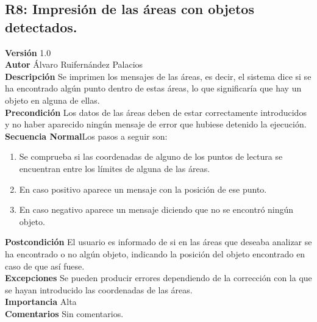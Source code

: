 \subsection{R8: Impresión de las áreas con objetos detectados.}
\textbf{Versión} 1.0\\
\textbf{Autor} Álvaro Ruifernández Palacios\\
\textbf{Descripción} Se imprimen los mensajes de las áreas, es decir, el sistema dice si se ha encontrado algún punto dentro de estas áreas, lo que significaría que hay un objeto en alguna de ellas.\\
\textbf{Precondición} Los datos de las áreas deben de estar correctamente introducidos y no haber aparecido ningún mensaje de error que hubiese detenido la ejecución.\\
\textbf{Secuencia Normal}Los pasos a seguir son:
\begin{enumerate}
	\item Se comprueba si las coordenadas de alguno de los puntos de lectura se encuentran entre los límites de alguna de las áreas.
	\item En caso positivo aparece un mensaje con la posición de ese punto.
	\item En caso negativo aparece un mensaje diciendo que no se encontró ningún objeto.
\end{enumerate}
\textbf{Postcondición} El usuario es informado de si en las áreas que deseaba analizar se ha encontrado o no algún objeto, indicando la posición del objeto encontrado en caso de que así fuese.\\
\textbf{Excepciones} Se pueden producir errores dependiendo de la corrección con la que se hayan introducido las coordenadas de las áreas.\\
\textbf{Importancia }Alta\\
\textbf{Comentarios} Sin comentarios.\\

